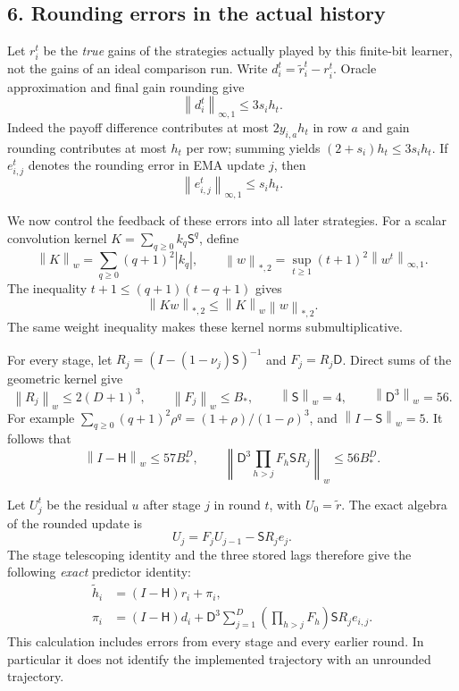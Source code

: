 \documentclass[11pt]{article}
\newcommand{\norm}[1]{\left\lVert#1\right\rVert}
\newcommand{\rn}[1]{\norm{#1}_{\infty,1}}
\newcommand{\Sh}{\mathsf S}
\newcommand{\Dif}{\mathsf D}
\newcommand{\Pred}{\mathsf H}
\begin{document}
\subsection*{6. Rounding errors in the actual history}
Let $r_i^t$ be the \emph{true} gains of the strategies actually played
by this finite-bit learner, not the gains of an ideal comparison run.
Write
$d_i^t=\widetilde r_i^t-r_i^t$.  Oracle approximation and final gain
rounding give
\begin{equation}\label{eq:gainerror}
 \rn{d_i^t}\leq3s_i h_t.
\end{equation}
Indeed the payoff difference contributes at most $2y_{i,a}h_t$
in row $a$ and gain rounding contributes at most $h_t$ per row;
summing yields $(2+s_i)h_t\leq3s_i h_t$.
If $e_{i,j}^t$ denotes the rounding error in EMA update $j$, then
\begin{equation}\label{eq:emaerror}
 \rn{e_{i,j}^t}\leq s_i h_t.
\end{equation}

We now control the feedback of these errors into all later strategies.
For a scalar convolution kernel $K=\sum_{q\geq0}k_q\Sh^q$, define
\[
 \norm K_w=\sum_{q\geq0}(q+1)^2|k_q|,
 \qquad\norm w_{*,2}=\sup_{t\geq1}(t+1)^2\rn{w^t}.
\]
The inequality $t+1\leq(q+1)(t-q+1)$ gives
\begin{equation}\label{eq:weightedfilter}
 \norm{Kw}_{*,2}\leq\norm K_w\norm w_{*,2}.
\end{equation}
The same weight inequality makes these kernel norms submultiplicative.

For every stage, let $R_j=(I-(1-\nu_j)\Sh)^{-1}$ and
$F_j=R_j\Dif$.  Direct sums of the geometric kernel give
\[
 \norm{R_j}_w\leq2(D+1)^3,\qquad
 \norm{F_j}_w\leq B_*,\qquad
 \norm\Sh_w=4,\qquad\norm{\Dif^3}_w=56.
\]
For example $\sum_{q\geq0}(q+1)^2\rho^q
=(1+\rho)/(1-\rho)^3$, and $\norm{I-\Sh}_w=5$.
It follows that
\begin{equation}\label{eq:kernelbounds}
 \norm{I-\Pred}_w\leq57B_*^D,
 \qquad
 \norm{\Dif^3\prod_{h>j}F_h\Sh R_j}_w
 \leq56B_*^D.
\end{equation}

Let $U_j^t$ be the residual $u$ after stage $j$ in round $t$,
with $U_0=\widetilde r$.  The exact algebra of the rounded update is
\[
 U_j=F_jU_{j-1}-\Sh R_je_j.
\]
The stage telescoping identity and the three stored lags therefore
give the following \emph{exact} predictor identity:
\begin{align}
 \widetilde h_i&=(I-\Pred)r_i+\pi_i,\label{eq:predictorerror}\\
 \pi_i&=(I-\Pred)d_i+
 \Dif^3\sum_{j=1}^D\left(\prod_{h>j}F_h\right)\Sh R_je_{i,j}.
 \label{eq:piexact}
\end{align}
This calculation includes errors from every stage and every earlier
round.  In particular it does not identify the implemented trajectory
with an unrounded trajectory.
\end{document}
